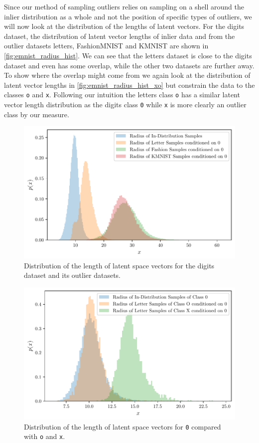 Since our method of sampling outliers relies on sampling on a shell around the
inlier distribution as a whole and not the position of specific types of
outliers, we will now look at the distribution of the lengths of latent
vectors. For the digits dataset, the distribution of latent vector lengths of inlier data
and from the outlier datasets letters, FashionMNIST and KMNIST are shown in
\autoref{fig:emnist_radius_hist}. We can see that the letters dataset is close
to the digits dataset and even has some overlap, while the other two datasets
are further away. To show where the overlap might come from we again look at
the distribution of latent vector lengths in
\autoref{fig:emnist_radius_hist_xo} but constrain the data to the classes
\texttt{o} and \texttt{x}. Following our intuition the letters class \texttt{o}
has a similar latent vector length distribution as the digits class \texttt{0}
while \texttt{x} is more clearly an outlier class by our measure.

\begin{figure}[htpb]
	\centering
	\includegraphics{figures/samples/emnist_radius_hist.pdf}
	\caption{Distribution of the length of latent space vectors for the
            digits dataset and its outlier datasets.}%
	\label{fig:emnist_radius_hist}
\end{figure}

\begin{figure}[htpb]
	\centering
	\includegraphics{figures/samples/emnist_radius_hist_xo.pdf}
	\caption{Distribution of the length of latent space vectors for
		\texttt{0} compared with \texttt{o} and \texttt{x}.}%
	\label{fig:emnist_radius_hist_xo}
\end{figure}


